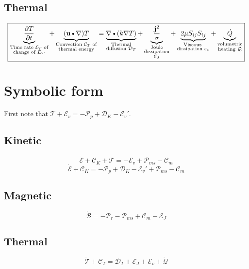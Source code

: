 \documentclass[11pt]{article}
\newcommand{\MC}{\mathcal}
\newcommand{\PD}{\partial}
\newcommand{\JSS}{\frac{\mathbf{j}^2}{\sigma}}
\renewcommand{\U}{\mathbf{u}}
\newcommand{\DOT}{\text{\textbullet}}
\begin{document}
\subsection{Thermal}
\begin{equation}
	\boxed{
	\underbrace{\frac{\PD T}{\PD t}}_{\substack{\text{Time rate $\MC E_T$ of} \\ \text{change of $E_T$}}} +
	\underbrace{(\U \DOT \nabla) T}_{\substack{\text{Convection $\MC C_T$ of} \\ \text{thermal energy}}}
	=
	\underbrace{\nabla \DOT (k \nabla T)}_{\substack{\text{Thermal} \\ \text{diffusion } \MC D_T}} +
	\underbrace{\JSS}_
	{\substack{\text{Joule}\\\text{dissipation}\\\text{$\MC E_J$}}} +
	\underbrace{2 \mu S_{ij}S_{ij}}_{\substack{\text{Viscous } \\ \text{dissipation } \varepsilon_v}} +
	\underbrace{\dot{Q}}_{\substack{\text{volumetric} \\ \text{heating } \dot{\MC Q}}}
	}
\end{equation}

\section{Symbolic form}
First note that $\MC T + \MC E_v = -\MC P_p + \MC D_K - \MC E_v'$.
\subsection{Kinetic}
\begin{equation}
	\dot{\MC E} + \MC C_K + \MC T = - \MC E_v + \MC P_{ms} - \MC C_m
\end{equation}
\begin{equation}
	\dot{\MC E} + \MC C_K = -\MC P_p + \MC D_K - \MC E_v' + \MC P_{ms} - \MC C_m
\end{equation}
\subsection{Magnetic}
\begin{equation}
	\dot{\MC B} = -\MC P_r - \MC P_{ms} + \MC C_m - \MC E_J
\end{equation}
\subsection{Thermal}
\begin{equation}
	\dot{\MC T} + \MC C_T = \MC D_T + \MC E_J + \MC E_v + \dot{\MC Q}
\end{equation}
\end{document}
